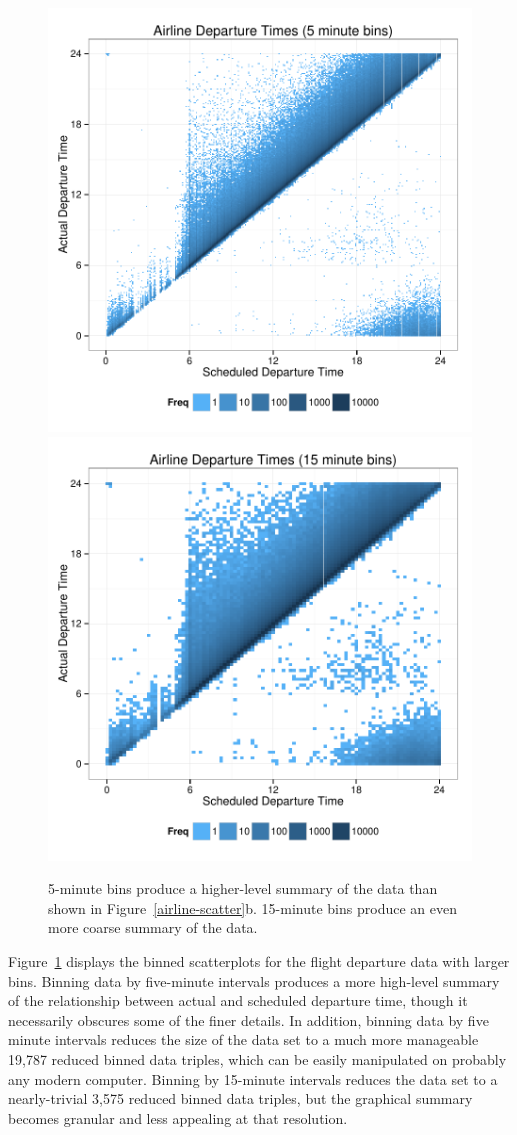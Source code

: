 \documentclass[11pt]{isuthesis}\usepackage[]{graphicx}\usepackage[]{color}
\begin{document}
\begin{figure}[hbtp]\centering
\includegraphics[width=.49\linewidth,keepaspectratio=true]{BinnedScatter/AirlineStdBinning5mins.pdf}
\includegraphics[width=.49\linewidth,keepaspectratio=true]{BinnedScatter/AirlineStdBinning15mins.pdf}
\caption{5-minute bins produce a higher-level summary of the data than shown in Figure~\ref{airline-scatter}b. 15-minute bins produce an even more coarse summary of the data.}\label{airline5mins-binning}
\end{figure}

Figure~\ref{airline5mins-binning} displays the binned scatterplots for the flight departure data with larger bins. Binning data by five-minute intervals produces a more high-level summary of the relationship between actual and scheduled departure time, though it necessarily obscures some of the finer details. In addition, binning data by five minute intervals reduces the size of the data set to a much more manageable 19,787 reduced binned data triples, which can be easily manipulated on probably any modern computer. Binning by 15-minute intervals reduces the data set to a nearly-trivial 3,575 reduced binned data triples, but the graphical summary becomes granular and less appealing at that resolution.
\end{document}

